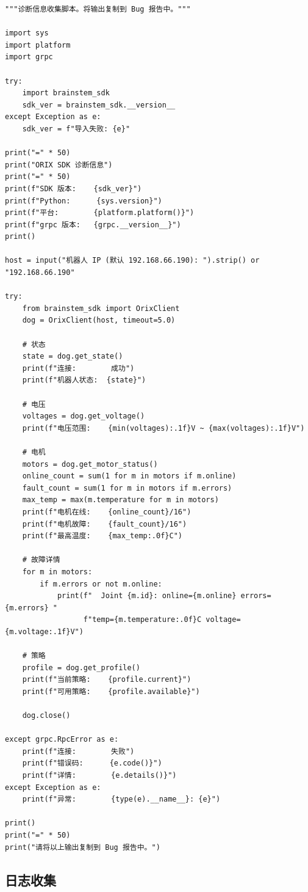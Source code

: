 \documentclass[a4paper,11pt,openany]{book}
\begin{document}
\begin{lstlisting}[style=python]
"""诊断信息收集脚本。将输出复制到 Bug 报告中。"""

import sys
import platform
import grpc

try:
    import brainstem_sdk
    sdk_ver = brainstem_sdk.__version__
except Exception as e:
    sdk_ver = f"导入失败: {e}"

print("=" * 50)
print("ORIX SDK 诊断信息")
print("=" * 50)
print(f"SDK 版本:    {sdk_ver}")
print(f"Python:      {sys.version}")
print(f"平台:        {platform.platform()}")
print(f"grpc 版本:   {grpc.__version__}")
print()

host = input("机器人 IP (默认 192.168.66.190): ").strip() or "192.168.66.190"

try:
    from brainstem_sdk import OrixClient
    dog = OrixClient(host, timeout=5.0)

    # 状态
    state = dog.get_state()
    print(f"连接:        成功")
    print(f"机器人状态:  {state}")

    # 电压
    voltages = dog.get_voltage()
    print(f"电压范围:    {min(voltages):.1f}V ~ {max(voltages):.1f}V")

    # 电机
    motors = dog.get_motor_status()
    online_count = sum(1 for m in motors if m.online)
    fault_count = sum(1 for m in motors if m.errors)
    max_temp = max(m.temperature for m in motors)
    print(f"电机在线:    {online_count}/16")
    print(f"电机故障:    {fault_count}/16")
    print(f"最高温度:    {max_temp:.0f}C")

    # 故障详情
    for m in motors:
        if m.errors or not m.online:
            print(f"  Joint {m.id}: online={m.online} errors={m.errors} "
                  f"temp={m.temperature:.0f}C voltage={m.voltage:.1f}V")

    # 策略
    profile = dog.get_profile()
    print(f"当前策略:    {profile.current}")
    print(f"可用策略:    {profile.available}")

    dog.close()

except grpc.RpcError as e:
    print(f"连接:        失败")
    print(f"错误码:      {e.code()}")
    print(f"详情:        {e.details()}")
except Exception as e:
    print(f"异常:        {type(e).__name__}: {e}")

print()
print("=" * 50)
print("请将以上输出复制到 Bug 报告中。")
\end{lstlisting}

\subsection{日志收集}
\end{document}
